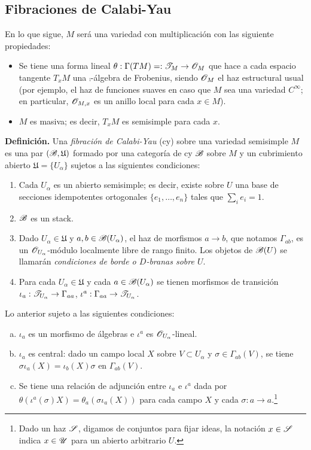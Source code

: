 {%
\subsection{Fibraciones de Calabi-Yau}

En lo que sigue, $M$ ser\'a una variedad con multiplicaci\'on con las siguiente propiedades:

\begin{itemize}
\item Se tiene una forma lineal $\theta :\Gamma(TM)=:\mathscr{T}_M\to \mathscr{O}_M$ que hace a cada espacio tangente $T_xM$ una $\comp$-\'algebra de Frobenius, siendo $\mathscr{O}_M$ el haz estructural usual (por ejemplo, el haz de funciones suaves en caso que $M$ sea una variedad $C^\infty$; en particular, $\mathscr{O}_{M,x}$ es un anillo local para cada $x\in M$).
\item $M$ es masiva; es decir, $T_xM$ es semisimple para cada $x$.
\end{itemize}
\medskip

{\bf Definici\'on.} Una \emph{fibraci\'on de Calabi-Yau} ({\sc cy}) sobre una variedad semisimple $M$ es una par $(\mathscr{B},\mathfrak{U})$ formado por una categor\'ia de {\sc cy} $\mathscr{B}$ sobre $M$ y un cubrimiento abierto $\mathfrak{U}=\{U_\alpha \}$ sujetos a las siguientes condiciones:
\begin{enumerate}
\item Cada $U_\alpha$ es un abierto semisimple; es decir, existe sobre $U$ una base de secciones idempotentes ortogonales $\{e_1,\dots ,e_n\}$ tales que $\sum_ie_i=1$.
\item $\mathscr{B}$ es un stack.
\item Dado $U_\alpha \in \mathfrak{U}$ y $a,b \in \mathscr{B}(U_\alpha )$, el haz de morfismos $a\to b$, que notamos $\Gamma_{ab}$, es un $\mathscr{O}_{U_\alpha }$-m\'odulo localmente libre de rango finito. Los objetos de $\mathscr{B}(U)$ se llamar\'an \emph{condiciones de borde o $D$-branas sobre $U$}.
\item Para cada $U_\alpha \in \mathfrak{U}$ y cada $a\in \mathscr{B}(U_\alpha )$ se tienen morfismos de transici\'on $\iota_a:\mathscr{T}_{U_\alpha }\to \Gamma_{aa}$, $\iota^a:\Gamma_{aa}\to \mathscr{T}_{U_\alpha}$.
\end{enumerate}
Lo anterior sujeto a las siguientes condiciones:
\begin{enumerate}[(a)]
\item $\iota_a$ es un morfismo de \'algebras e $\iota^a$ es $\mathscr{O}_{U_\alpha }$-lineal.
\item $\iota_a$ es central: dado un campo local $X$ sobre $V\subset U_\alpha$ y $\sigma \in \Gamma_{ab}(V)$, se tiene $\sigma \iota_a(X)=\iota_b(X)\sigma$ en $\Gamma_{ab}(V)$.
\item Se tiene una relaci\'on de adjunci\'on entre $\iota_a$ e $\iota^a$ dada por $\theta (\iota^a(\sigma )X)=\theta_a(\sigma \iota_a(X))$ para cada campo $X$ y cada $\sigma :a\to a$.\footnote{Dado un haz $\mathscr{S}$, digamos de conjuntos para fijar ideas, la notaci\'on $x\in \mathscr{S}$ indica $x\in \mathscr{U}$ para un abierto arbitrario $U$.}
\end{enumerate}

}
